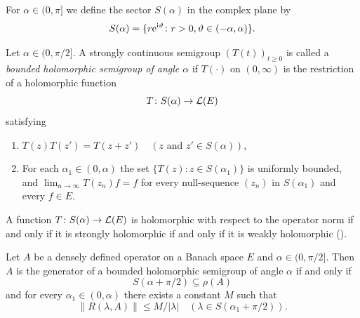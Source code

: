 For $\alpha \in (0,\pi]$ we define the sector $S(\alpha)$ in the complex plane by
\[
    S(\alpha) = \{r\eu^{\im\theta} \colon r > 0, \theta \in (-\alpha,\alpha)\} .
\]
\begin{definition}\label{def:a2-1.11}
Let $\alpha \in (0,\pi/2]$.
A strongly continuous semigroup $(T(t))_{t \geq 0}$ is called a \emph{bounded holomorphic semigroup of angle $\alpha$} if\/ $T(\cdot)$ on $(0,\infty)$ is the restriction of a holomorphic function
\[
    T \colon S(\alpha) \to \mathcal{L}(E)
\]
satisfying
\begin{enumerate}[\upshape(i), wide, labelindent=.25em]

\item
$T(z)T(z') = T(z+z') \quad (z \text{ and } z' \in S(\alpha))$,

\item
For each  $ \alpha_{1} \in (0,\alpha) $  the set   
$ \{ T(z) \colon z \in S(\alpha_{1}) \} $
is uniformly bounded, and  
$\lim_{n \to \infty} T(z_{n})f = f$ 
for every null-sequence  $(z_{n})$ 
in  $ S( \alpha_{1} ) $  and every   $f \in E$.

\end{enumerate}
\end{definition}
\begin{remark*}\label{rem:a2-1.5-kgk}
A function $T \colon S(\alpha) \to \mathcal{L}(E)$ is holomorphic with respect to the operator norm if and only if it is strongly holomorphic if and only if it is weakly holomorphic (\textcite[V.3]{yosida:1965}).
\end{remark*}
\begin{theorem}\label{thm:a2-1.12}
Let $A$ be a densely defined operator on a Banach space $E$ and $\alpha \in (0,\pi/2]$.
Then $A$ is the generator of a bounded holomorphic semigroup of angle $\alpha$ if and only if 
\[
S(\alpha + \pi/2) \subseteq \rho(A)
\]
and for every $\alpha_{1} \in (0,\alpha)$ there exists a constant $M$ such that
\begin{equation}\label{eq:a2-1.6}
    \|R(\lambda,A)\| \leq M/|\lambda| \quad (\lambda \in S(\alpha_{1} + \pi/2)). 
\end{equation}
\end{theorem}

